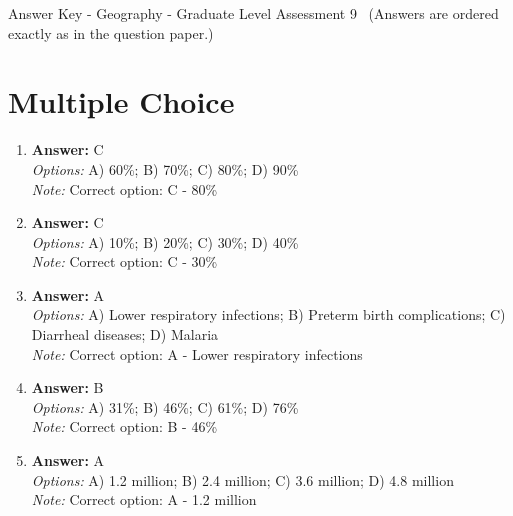 \documentclass[12pt]{article}
\begin{document}
\begin{center}
Answer Key - Geography - Graduate Level Assessment 9 \
\small (Answers are ordered exactly as in the question paper.)
\end{center}

\section*{Multiple Choice}
\begin{enumerate}[label=\arabic*.]
\item \textbf{Answer:} C
\\ \textit{Options:} A) 60\%; B) 70\%; C) 80\%; D) 90\%
\\ \textit{Note:} Correct option: C - 80\%
\item \textbf{Answer:} C
\\ \textit{Options:} A) 10\%; B) 20\%; C) 30\%; D) 40\%
\\ \textit{Note:} Correct option: C - 30\%
\item \textbf{Answer:} A
\\ \textit{Options:} A) Lower respiratory infections; B) Preterm birth complications; C) Diarrheal diseases; D) Malaria
\\ \textit{Note:} Correct option: A - Lower respiratory infections
\item \textbf{Answer:} B
\\ \textit{Options:} A) 31\%; B) 46\%; C) 61\%; D) 76\%
\\ \textit{Note:} Correct option: B - 46\%
\item \textbf{Answer:} A
\\ \textit{Options:} A) 1.2 million; B) 2.4 million; C) 3.6 million; D) 4.8 million
\\ \textit{Note:} Correct option: A - 1.2 million
\end{enumerate}
\end{document}
